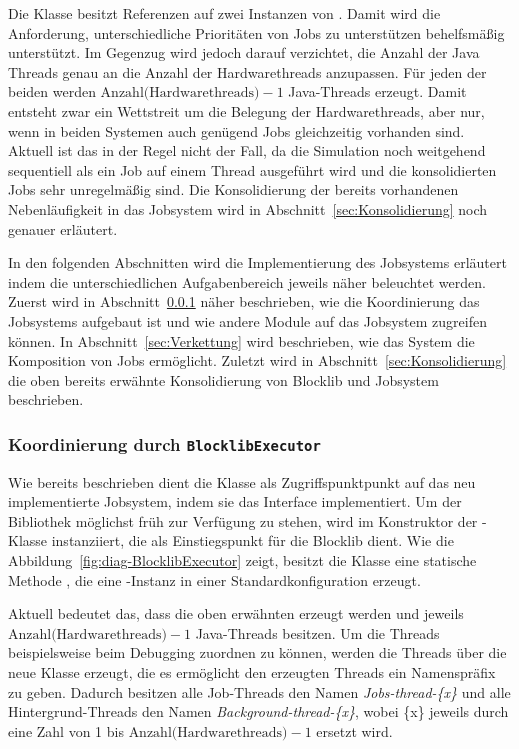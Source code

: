 Die Klasse besitzt Referenzen auf zwei Instanzen von . Damit wird die Anforderung, unterschiedliche Prioritäten von Jobs zu unterstützen behelfsmäßig unterstützt. Im Gegenzug wird jedoch darauf verzichtet, die Anzahl der Java Threads genau an die Anzahl der Hardwarethreads anzupassen. Für jeden der beiden  werden $\text{Anzahl(Hardwarethreads)} - 1$ Java-Threads erzeugt. Damit entsteht zwar ein Wettstreit um die Belegung der Hardwarethreads, aber nur, wenn in beiden Systemen auch genügend Jobs gleichzeitig vorhanden sind. Aktuell ist das in der Regel nicht der Fall, da die Simulation noch weitgehend sequentiell als ein Job auf einem Thread ausgeführt wird und die konsolidierten Jobs sehr unregelmäßig sind. Die Konsolidierung der bereits vorhandenen Nebenläufigkeit in das Jobsystem wird in Abschnitt~\ref{sec:Konsolidierung} noch genauer erläutert. 

In den folgenden Abschnitten wird die Implementierung des Jobsystems erläutert indem die unterschiedlichen Aufgabenbereich jeweils näher beleuchtet werden. Zuerst wird in Abschnitt~\ref{sec:Koordinierung} näher beschrieben, wie die Koordinierung das Jobsystems aufgebaut ist und wie andere Module auf das Jobsystem zugreifen können. In Abschnitt~\ref{sec:Verkettung} wird beschrieben, wie das System die Komposition von Jobs ermöglicht. Zuletzt wird in Abschnitt~\ref{sec:Konsolidierung} die oben bereits erwähnte Konsolidierung von Blocklib und Jobsystem beschrieben.

\subsubsection{Koordinierung durch \texttt{BlocklibExecutor}}\label{sec:Koordinierung}

Wie bereits beschrieben dient die Klasse  als Zugriffspunktpunkt auf das neu implementierte Jobsystem, indem sie das Interface  implementiert. Um der Bibliothek möglichst früh zur Verfügung zu stehen, wird  im Konstruktor der -Klasse instanziiert, die als Einstiegspunkt für die Blocklib dient. Wie die Abbildung~\vref{fig:diag-BlocklibExecutor} zeigt, besitzt die Klasse  eine statische Methode , die eine -Instanz in einer Standardkonfiguration erzeugt.

Aktuell bedeutet das, dass die oben erwähnten  erzeugt werden und jeweils $\text{Anzahl(Hardwarethreads)} - 1$ Java-Threads besitzen. Um die Threads beispielsweise beim Debugging zuordnen zu können, werden die Threads über die neue Klasse  erzeugt, die es ermöglicht den erzeugten Threads ein Namenspräfix zu geben. Dadurch besitzen alle Job-Threads den Namen \emph{Jobs-thread-\{x\}} und alle Hintergrund-Threads den Namen \emph{Background-thread-\{x\}}, wobei \{x\} jeweils durch eine Zahl von 1 bis $\text{Anzahl(Hardwarethreads)} - 1$ ersetzt wird.

